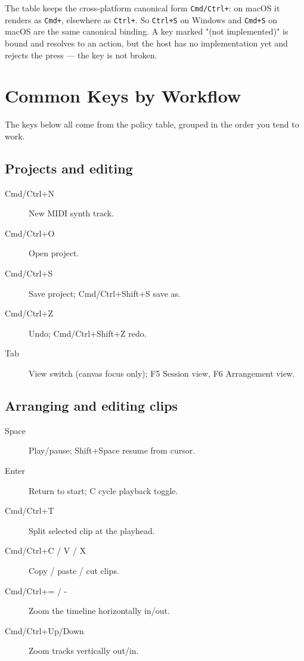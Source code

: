 The table keeps the cross-platform canonical form \texttt{Cmd/Ctrl+}: on macOS it
renders as \texttt{Cmd+}, elsewhere as \texttt{Ctrl+}. So \texttt{Ctrl+S} on Windows
and \texttt{Cmd+S} on macOS are the same canonical binding. A key marked "(not
implemented)" is bound and resolves to an action, but the host has no implementation
yet and rejects the press — the key is not broken.

\section{Common Keys by Workflow}

The keys below all come from the policy table, grouped in the order you tend to work.

\subsection{Projects and editing}

\begin{description}
  \item[Cmd/Ctrl+N] New MIDI synth track.
  \item[Cmd/Ctrl+O] Open project.
  \item[Cmd/Ctrl+S] Save project; Cmd/Ctrl+Shift+S save as.
  \item[Cmd/Ctrl+Z] Undo; Cmd/Ctrl+Shift+Z redo.
  \item[Tab] View switch (canvas focus only); F5 Session view, F6 Arrangement view.
\end{description}

\subsection{Arranging and editing clips}

\begin{description}
  \item[Space] Play/pause; Shift+Space resume from cursor.
  \item[Enter] Return to start; C cycle playback toggle.
  \item[Cmd/Ctrl+T] Split selected clip at the playhead.
  \item[Cmd/Ctrl+C / V / X] Copy / paste / cut clips.
  \item[Cmd/Ctrl+= / -] Zoom the timeline horizontally in/out.
  \item[Cmd/Ctrl+Up/Down] Zoom tracks vertically out/in.
\end{description}

